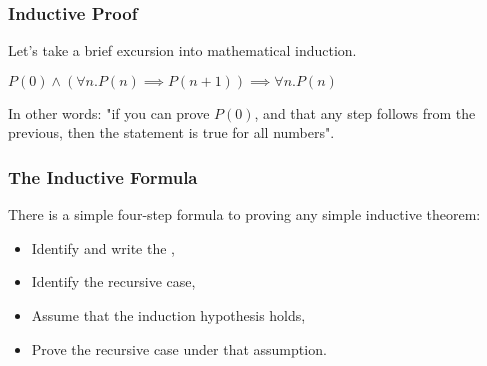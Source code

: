 \documentclass[aspectratio=169, handout]{beamer}
\begin{document}

\begin{frame}[fragile]
  \frametitle{Inductive Proof}

  Let's take a brief excursion into mathematical induction.

  \pause
  \vspace{\fill}


  \pause
  \vspace{5pt}

  \begin{center}
     $P(0) \land (\forall n. P(n) \implies P(n + 1)) \implies \forall n. P(n)$
  \end{center}

  \pause
  \vspace{\fill}

  In other words: "if you can prove $P(0)$, and that any step follows from the
  previous, then the statement is true for all numbers".
\end{frame}

\begin{frame}[fragile]
  \frametitle{The Inductive Formula}

  There is a simple four-step formula to proving any simple inductive theorem:

  \pause
  \vspace{5pt}

  \begin{itemize}
    \item Identify and write the , \pause
    \item Identify the recursive case, \pause
    \item Assume that the induction hypothesis holds, \pause
    \item Prove the recursive case under that assumption. \pause
  \end{itemize}

  \pause
  \vspace{\fill}

\end{frame}
\end{document}
